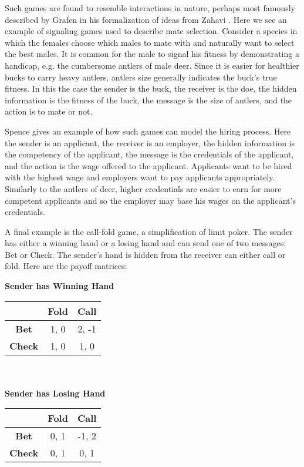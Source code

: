 \documentclass{article}
\begin{document}
Such games are found to resemble interactions in nature, perhaps most famously described by Grafen \cite{grafen1} in his formalization of ideas from Zahavi \cite{zahavi1}. Here we see an example of signaling games used to describe mate selection. Consider a species in which the females choose which males to mate with and naturally want to select the best males. It is common for the male to signal his fitness by demonstrating a handicap, e.g. the cumbersome antlers of male deer. Since it is easier for healthier bucks to carry heavy antlers, antlers size generally indicates the buck's true fitness. In this the case the sender is the buck, the receiver is the doe, the hidden information is the fitness of the buck, the message is the size of antlers, and the action is to mate or not. 

Spence \cite{spence1} gives an example of how such games can model the hiring process. Here the sender is an applicant, the receiver is an employer, the hidden information is the competency of the applicant, the message is the credentials of the applicant, and the action is the wage offered to the applicant. Applicants want to be hired with the highest wage and employers want to pay applicants appropriately. Similarly to the antlers of deer, higher credentials are easier to earn for more competent applicants and so the employer may base his wages on the applicant's credentials.

A final example is the call-fold game, a simplification of limit poker. The sender has either a winning hand or a losing hand and can send one of two messages: Bet or Check. The sender's hand is hidden from the receiver can either call or fold. Here are the payoff matrices:

\textbf{Sender has Winning Hand}\\
\begin{tabular}{c | c | c} & \textbf{Fold} & \textbf{Call} \\ \hline \textbf{Bet} & 1, 0 & 2, -1 \\ \hline  \textbf{Check} & 1, 0 & 1, 0 \end{tabular}
\\ \\
\textbf{Sender has Losing Hand}\\
\begin{tabular}{c | c | c} & \textbf{Fold} & \textbf{Call} \\ \hline \textbf{Bet} & 0, 1 & -1, 2 \\ \hline  \textbf{Check} & 0, 1 & 0, 1 \end{tabular}
\\ \\
\end{document}
